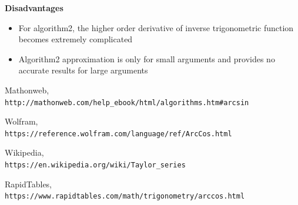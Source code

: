 \documentclass[12pt]{report}
\begin{document}
\textbf{Disadvantages}
\begin{itemize}
    \item For algorithm2, the higher order derivative of inverse trigonometric function becomes extremely complicated
    \item Algorithm2 approximation is only for small arguments and provides no accurate results for large arguments
\end{itemize}

\begin{thebibliography}{9}
Mathonweb,
\\\texttt{http://mathonweb.com/help\_ebook/html/algorithms.htm\#arcsin}

Wolfram,
\\\texttt{https://reference.wolfram.com/language/ref/ArcCos.html}

Wikipedia,
\\\texttt{https://en.wikipedia.org/wiki/Taylor\_series}

RapidTables,
\\\texttt{https://www.rapidtables.com/math/trigonometry/arccos.html}
\end{thebibliography}
\end{document}
